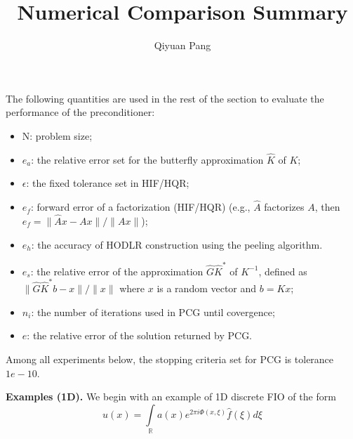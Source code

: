 \documentclass[11pt]{article}
\begin{document}
\title{Numerical Comparison Summary}
\author{Qiyuan Pang}

\maketitle

The following quantities are used in the rest of the section to
evaluate the performance of the preconditioner:

\begin{itemize}
\item N: problem size;
\item $e_{a}$: the relative error set for the butterfly approximation $\hat{K}$ of $K$;
\item $\epsilon$: the fixed tolerance set in HIF/HQR;
\item $e_{f}$: forward error of a factorization (HIF/HQR) (e.g., $\hat{A}$ factorizes $A$, then $e_{f} = \|\hat{A}x-Ax\|/\|Ax\|$);
\item $e_{h}$: the accuracy of HODLR construction using the peeling algorithm.
\item $e_{s}$: the relative error of the approximation $\hat{G}\hat{K}^{*}$ of $K^{-1}$, defined as $\|\hat{G}\hat{K}^{*}b - x\|/\|x\|$ where $x$ is a random vector and $b = Kx$;
\item $n_{i}$: the number of iterations used in PCG until covergence;
\item $e$: the relative error of the solution returned by PCG.
\end{itemize}

Among all experiments below, the stopping criteria set for PCG is tolerance $1e-10$.

\textbf{Examples (1D).} We begin with an example of 1D discrete FIO of the form
\begin{equation*}
u(x) = \int\limits_{\mathbb{R}}a(x)e^{2\pi i \Phi(x, \xi)}\hat{f}(\xi) d\xi
\end{equation*}
\end{document}
